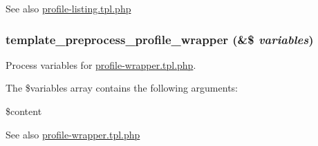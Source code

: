 \begin{DoxySeeAlso}{See also}
\hyperlink{profile-listing_8tpl_8php}{profile-\/listing.tpl.php} 
\end{DoxySeeAlso}
\hypertarget{profile_8module_af0ca4c9b63d8be38a0c7f354bf94ab6e}{
\subsubsection[{template\_\-preprocess\_\-profile\_\-wrapper}]{\setlength{\rightskip}{0pt plus 5cm}template\_\-preprocess\_\-profile\_\-wrapper (\&\$ {\em variables})}}
\label{profile_8module_af0ca4c9b63d8be38a0c7f354bf94ab6e}
Process variables for \hyperlink{profile-wrapper_8tpl_8php}{profile-\/wrapper.tpl.php}.

The \$variables array contains the following arguments:
\begin{DoxyItemize}
\item \$content
\end{DoxyItemize}

\begin{DoxySeeAlso}{See also}
\hyperlink{profile-wrapper_8tpl_8php}{profile-\/wrapper.tpl.php} 
\end{DoxySeeAlso}
